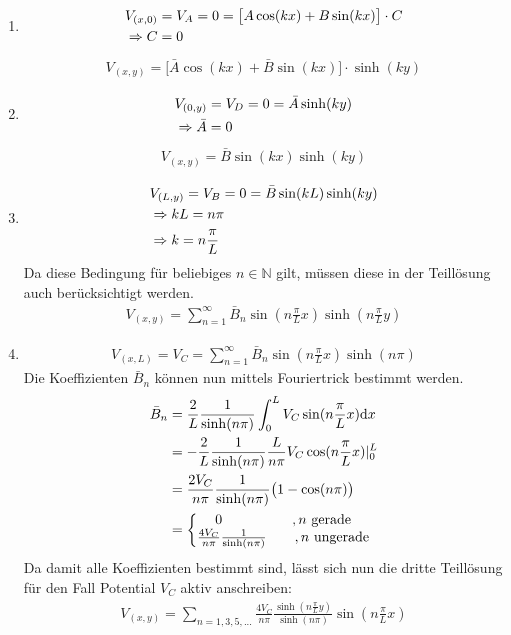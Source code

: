 \begin{enumerate}
	\item \begin{align}
		&V_{(x,0)} = V_A = 0 = \bigl[A \cos(kx) + B \sin(kx) \bigr] \cdot C \\
		&\Rightarrow C = 0 \notag
	\end{align}
	\begin{align}
		V_{(x,y)} = \bigl[ \bar{A} \cos(kx) + \bar{B} \sin(kx) \bigr] \cdot \sinh(ky)
	\end{align}
	
	\item \begin{align}
		&V_{(0,y)} = V_D = 0 = \bar{A} \sinh(ky) \\
		&\Rightarrow \bar{A} = 0 \notag
	\end{align}
	\begin{align}
		V_{(x,y)} = \bar{B} \sin(kx) \sinh(ky)
	\end{align}
	
	\item \begin{align}
		&V_{(L,y)} = V_B = 0 = \bar{B} \sin(kL) \sinh(ky) \\
		&\Rightarrow kL = n\pi \notag \\
		&\Rightarrow k = n \frac{\pi}{L} \notag	
	\end{align}
	Da diese Bedingung für beliebiges $n \in \mathbb{N}$ gilt, müssen diese in der Teillösung auch berücksichtigt werden. 
	\begin{align}
		V_{(x,y)} = \sum_{n=1}^\infty \bar{B}_n \sin(n \frac{\pi}{L}x) \sinh(n \frac{\pi}{L}y)
	\end{align}
	
	\item \begin{align}
		V_{(x,L)} = V_C = \sum_{n=1}^\infty \bar{B}_n \sin(n \frac{\pi}{L}x) \sinh(n \pi)
	\end{align}
	Die Koeffizienten $\bar{B}_n$ können nun mittels \glqq Fouriertrick\grqq{} bestimmt werden. 
	\begin{align}
		\bar{B}_n &= \frac{2}{L} \frac{1}{\sinh(n \pi)} \int_0^L V_C \sin(n \frac{\pi}{L}x) \mathrm{d}x \\
		&= -\frac{2}{L} \frac{1}{\sinh(n \pi)} \frac{L}{n \pi} V_C \cos(n \frac{\pi}{L}x) |_0^L \notag \\
		&= \frac{2V_C}{n \pi} \frac{1}{\sinh(n \pi)} \bigl(1 - \cos(n \pi)\big) \notag \\
		&= \biggl\{ \begin{matrix}
			0 \qquad \qquad \quad , n~\mathrm{gerade} \\
			\frac{4V_C}{n \pi} \frac{1}{\sinh(n \pi)} \qquad , n~\mathrm{ungerade}
		\end{matrix} \notag
	\end{align}
	Da damit alle Koeffizienten bestimmt sind, lässt sich nun die dritte Teillösung für den Fall Potential $V_C$ aktiv anschreiben:
	\begin{align}
		V_{(x,y)} = \sum_{n = 1,3,5,...} \frac{4V_C}{n \pi} \frac{\sinh(n \frac{\pi}{L}y)}{\sinh(n \pi)} \sin(n \frac{\pi}{L}x) \label{eq:V_Teil1_3}
	\end{align}
\end{enumerate}

